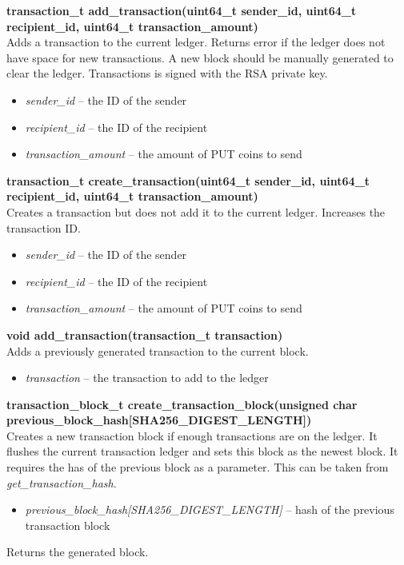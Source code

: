 \documentclass{article}
\begin{document}
\textbf{transaction\_t add\_transaction(uint64\_t sender\_id, uint64\_t recipient\_id, uint64\_t transaction\_amount)} \\
Adds a transaction to the current ledger. Returns error if the ledger does not have space for new transactions. A new block should be manually generated to clear the ledger. Transactions is signed with the RSA private key.
\begin{itemize}
\item \textit{sender\_id} -- the ID of the sender
\item \textit{recipient\_id} -- the ID of the recipient
\item \textit{transaction\_amount} -- the amount of PUT coins to send
\end{itemize}

\textbf{transaction\_t create\_transaction(uint64\_t sender\_id, uint64\_t recipient\_id, uint64\_t transaction\_amount)} \\
Creates a transaction but does not add it to the current ledger. Increases the transaction ID.
\begin{itemize}
    \item \textit{sender\_id} -- the ID of the sender
    \item \textit{recipient\_id} -- the ID of the recipient
    \item \textit{transaction\_amount} -- the amount of PUT coins to send
\end{itemize}

\textbf{void add\_transaction(transaction\_t transaction)} \\
Adds a previously generated transaction to the current block.
\begin{itemize}
    \item \textit{transaction} -- the transaction to add to the ledger
\end{itemize}

\textbf{transaction\_block\_t create\_transaction\_block(unsigned char previous\_block\_hash[SHA256\_DIGEST\_LENGTH])} \\
Creates a new transaction block if enough transactions are on the ledger. It flushes the current transaction ledger and sets this block as the newest block.
It requires the has of the previous block as a parameter. This can be taken from \textit{get\_transaction\_hash}.
\begin{itemize}
    \item \textit{previous\_block\_hash[SHA256\_DIGEST\_LENGTH]} -- hash of the previous transaction block
\end{itemize}
Returns the generated block. \\ \par
\end{document}
